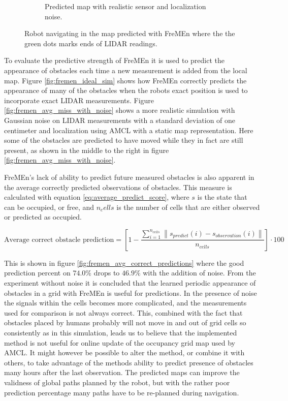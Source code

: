 \begin{figure}[htbp]
\begin{subfigure}[t]{0.49\textwidth}
        \caption{Predicted map with realistic sensor and localization noise.}
        \label{fig:fremen_sim_with_noise}
    \end{subfigure}
    \caption{Robot navigating in the map predicted with FreMEn where the the green dots marks ends of LIDAR readings.}
\end{figure}

To evaluate the predictive strength of FreMEn it is used to predict the appearance of obstacles each time a new measurement is added from the local map. 
Figure \ref{fig:fremen_ideal_sim} shows how FreMEn correctly predicts the appearance of many of the obstacles when the robots exact position is used to incorporate exact LIDAR measurements. 
Figure \ref{fig:fremen_avg_miss_with_noise} shows a more realistic simulation with Gaussian noise on LIDAR measurements with a standard deviation of one centimeter and localization using AMCL with a static map representation.
Here some of the obstacles are predicted to have moved while they in fact are still present, as shown in the middle to the right in figure \ref{fig:fremen_avg_miss_with_noise}.

FreMEn's lack of ability to predict future measured obstacles is also apparent in the average correctly predicted observations of obstacles. This measure is calculated with equation \ref{eq:average_predict_score}, where $s$ is the state that can be occupied, or free, and $n_cells$ is the number of cells that are either observed or predicted as occupied.

\begin{equation}
    \text{Average correct obstacle prediction} = \left[1- \frac{\sum\limits_{i=1}^{n_{cells}} \left\|s_{predict}(i)-s_{observation}(i)\right\|}{n_{cells}}
    \right]\cdot 100
    \label{eq:average_predict_score}
\end{equation} 

This is shown in figure \ref{fig:fremen_avg_correct_predictions} where the good prediction percent on $74.0\%$ drops to $46.9\%$ with the addition of noise.
From the experiment without noise it is concluded that the learned periodic appearance of obstacles in a grid with FreMEn is useful for predictions.
In the presence of noise the signals within the cells becomes more complicated, and the measurements used for comparison is not always correct.
This, combined with the fact that obstacles placed by humans probably will not move in and out of grid cells so consistently as in this simulation, leads us to believe that the implemented method is not useful for online update of the occupancy grid map used by AMCL.
It might however be possible to alter the method, or combine it with others, to take advantage of the methods ability to predict presence of obstacles many hours after the last observation.
The predicted maps can improve the validness of global paths planned by the robot, but with the rather poor prediction percentage many paths have to be re-planned during navigation. 

